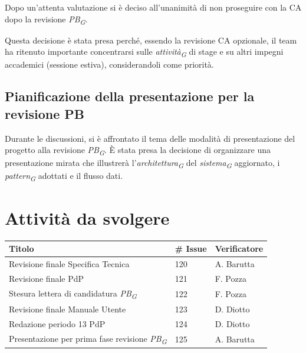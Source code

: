 \documentclass{article}
\begin{document}
    Dopo un'attenta valutazione si è deciso all'unanimità di non proseguire con la CA dopo la revisione \textit{PB}\textsubscript{\textit{G}}. 
    
    Questa decisione è stata presa perché, essendo la revisione CA opzionale, il team ha ritenuto importante concentrarsi sulle \textit{attività}\textsubscript{\textit{G}} di stage e su altri impegni accademici (sessione estiva), considerandoli come priorità.

    \subsection{Pianificazione della presentazione per la revisione PB}
    Durante le discussioni, si è affrontato il tema delle modalità di presentazione del progetto alla revisione \textit{PB}\textsubscript{\textit{G}}. È stata presa la decisione di organizzare una presentazione mirata che illustrerà l'\textit{architettura}\textsubscript{\textit{G}} del \textit{sistema}\textsubscript{\textit{G}} aggiornato, i \textit{pattern}\textsubscript{\textit{G}} adottati e il flusso dati.

    \section{Attività da svolgere}
    \begin{center}
        \begin{tabular}{|C{7cm}|C{1,5cm}|C{3cm}|}
            \hline
            \textbf{Titolo} & \textbf{\# Issue} & \textbf{Verificatore} \\
            \hline
            \hline
            Revisione finale Specifica Tecnica & 120 & A. Barutta \\
            \hline
            Revisione finale PdP & 121 & F. Pozza \\
            \hline
            Stesura lettera di candidatura \textit{PB}\textsubscript{\textit{G}} & 122 & F. Pozza \\
            \hline
            Revisione finale Manuale Utente & 123 & D. Diotto \\
            \hline
            Redazione periodo 13 PdP & 124 & D. Diotto \\
            \hline
            Presentazione per prima fase revisione \textit{PB}\textsubscript{\textit{G}} & 125 & A. Barutta \\
            \hline
        \end{tabular}
    \end{center}
\end{document}
